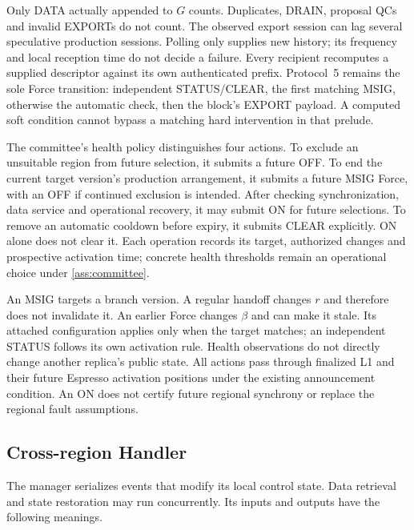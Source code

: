 \documentclass[11pt,a4paper]{article}
\begin{document}
Only DATA actually appended to $G$ counts. Duplicates, DRAIN, proposal
QCs and invalid EXPORTs do not count. The observed export session can
lag several speculative production sessions. Polling only supplies new
history; its frequency and local reception time do not decide a failure.
Every recipient recomputes a supplied descriptor against its own
authenticated prefix. Protocol~5 remains the sole Force transition:
independent STATUS/CLEAR, the first matching MSIG, otherwise the
automatic check, then the block's EXPORT payload. A computed soft
condition cannot bypass a matching hard intervention in that prelude.

The committee's health policy distinguishes four actions. To exclude
an unsuitable region from future selection, it submits a future OFF.
To end the current target version's production arrangement, it submits
a future MSIG Force, with an OFF if continued exclusion is intended.
After checking synchronization, data service and operational recovery,
it may submit ON for future selections. To remove an automatic cooldown
before expiry, it submits CLEAR explicitly. ON alone does not clear it.
Each operation records its target, authorized changes and prospective
activation time; concrete health thresholds remain an operational
choice under \cref{ass:committee}.

An MSIG targets a branch version. A regular handoff changes $r$ and
therefore does not invalidate it. An earlier Force changes $\beta$ and
can make it stale. Its attached configuration applies only when the
target matches; an independent STATUS follows its own activation rule.
Health observations do not directly change another replica's public
state. All actions pass through finalized L1 and their future Espresso
activation positions under the existing announcement condition.
An ON does not certify future regional synchrony or replace the
regional fault assumptions.

\subsection{Cross-region Handler}
\label{sec:session-manager}
The manager serializes events that modify its local control state.
Data retrieval and state restoration may run concurrently. Its
inputs and outputs have the following meanings.
\end{document}

